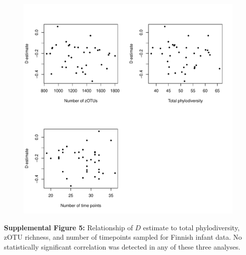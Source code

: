 \documentclass{article}
\begin{document}
{\begin{figure}[t]
	\centering
	\includegraphics[scale=0.80]{figs/Fig_S5.pdf}
\end{figure}
\textbf{Supplemental Figure 5:}\label{sec:figureS5} Relationship of \(D\) estimate to total phylodiversity, zOTU richness, and number of timepoints sampled for Finnish infant data. No statistically significant correlation was detected in any of these three analyses. 

}%
\end{document}
